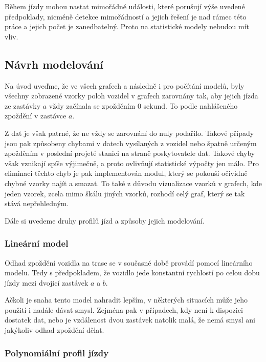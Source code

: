 \bigbreak


Během jízdy mohou nastat mimořádné události, které porušují výše uvedené předpoklady, nicméně detekce mimořádností a jejich řešení je nad rámec této práce a jejich počet je zanedbatelný. Proto na statistické modely nebudou mít vliv.


\subsection{Návrh modelování} \label{subsubsection:analyza_dat}


Na úvod uveďme, že ve všech grafech a následně i pro počítání modelů, byly všechny zobrazené vzorky poloh vozidel v grafech zarovnány tak, aby jejich jízda ze zastávky $a$ vždy začínala se zpožděním 0 sekund. To podle nahlášeného zpoždění v zastávce $a$.


\bigbreak


Z dat je však patrné, že ne vždy se zarovnání do nuly podařilo. Takové případy jsou pak způsobeny chybami v datech vysílaných z vozidel nebo špatně určeným zpožděním v poslední projeté stanici na straně poskytovatele dat. Takové chyby však vznikají spíše výjimečně, a proto ovlivňují statistické výpočty jen málo. Pro eliminaci těchto chyb je pak implementován modul, který se pokouší očividně chybné vzorky najít a smazat. To také z důvodu vizualizace vzorků v grafech, kde jeden vzorek, zcela mimo škálu jiných vzorků, rozhodí celý graf, který se tak stává nepřehledným.


\bigbreak


Dále si uvedeme druhy profilů jízd a způsoby jejich modelování.


\subsubsection{Lineární model}




Odhad zpoždění vozidla na trase se v současné době provádí pomocí lineárního modelu. Tedy s předpokladem, že vozidlo jede konstantní rychlostí po celou dobu jízdy mezi dvojicí zastávek $a$ a $b$.


\bigbreak


Ačkoli je snaha tento model nahradit lepším, v některých situacích může jeho použití i nadále dávat smysl. Zejména pak v případech, kdy není k dispozici dostatek dat, nebo je vzdálenost dvou zastávek natolik malá, že nemá smysl ani jakýkoliv odhad zpoždění dělat.


\subsubsection{Polynomiální profil jízdy}


